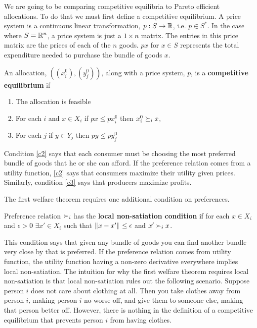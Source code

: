 We are going to be comparing competitive equilibria to Pareto
efficient allocations. To do that we must first define a competitive
equilibrium. A price system is a continuous linear transformation,
$p:S \rightarrow \mathbb{R}$, i.e. $p \in S^\ast$. In the case where $S =
\mathbb{R}^n$, a price system is just a $1 \times n$ matrix. The entries in
this price matrix are the prices of each of the $n$ goods. $px$ for $x
\in S$ represents the total expenditure needed to purchase the bundle
of goods $x$.
\begin{definition}
  An allocation, $((x_i^0),(y_j^0))$, along with a price system, $p$,
  is a \textbf{competitive equilibrium} if 
  \renewcommand{\theenumi}{C\arabic{enumi}}
  \begin{enumerate}
  \item\label{c1} The allocation is feasible
  \item\label{c2} For each $i$ and $x \in X_i$ if $px \leq px_i^0$
    then $x_i^0 \succeq_i x$,
  \item\label{c3} For each $j$ if $y \in Y_j$ then $p y \leq p y_j^0$
  \end{enumerate}
  \renewcommand{\theenumi}{\roman{enumi}}
\end{definition}
Condition \ref{c2} says that each consumer must be choosing the most
preferred bundle of goods that he or she can afford. If the preference
relation comes from a utility function, \ref{c2} says that consumers
maximize their utility given prices. Similarly, condition \ref{c3}
says that producers maximize profits.

The first welfare theorem requires one additional condition on
preferences.
\begin{definition}
  Preference relation $\succ_i$ has the \textbf{local non-satiation
    condition} if for each $x \in X_i$ and $\epsilon > 0$ $\exists x'
  \in X_i$ such that $\left\Vert {x - x'} \right\Vert \leq \epsilon $ and $x' \succ_i
  x$.
\end{definition}
This condition says that given any bundle of goods you can find
another bundle very close by that is preferred. If the preference
relation comes from utility function, the utility function having a
non-zero derivative everywhere implies local non-satiation. The
intuition for why the first welfare theorem requires local
non-satiation is that local non-satiation rules out the following
scenario. Suppose person $i$ does not care about clothing at all. Then 
you take clothes away from person $i$, making person $i$ no worse off,
and give them to someone else, making that person better off. However,
there is nothing in the definition of a competitive equilibrium that
prevents person $i$ from having clothes.

